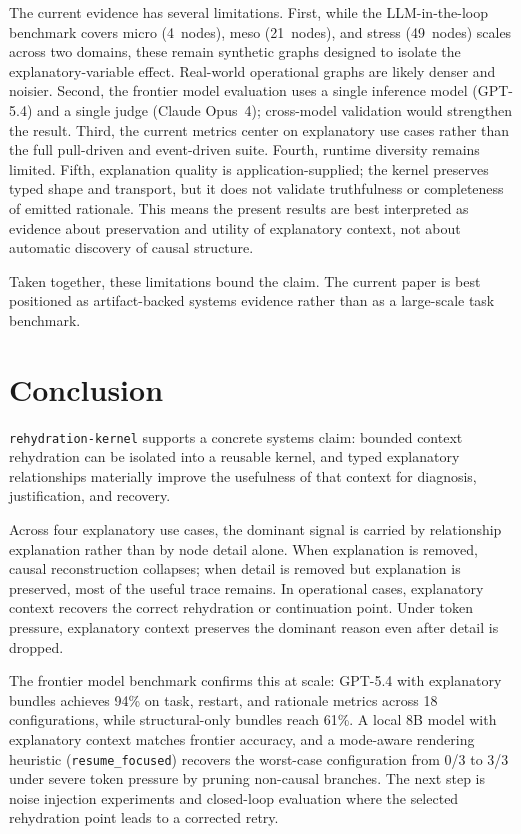 \documentclass[11pt]{article}
\begin{document}
The current evidence has several limitations. First, while the
LLM-in-the-loop benchmark covers micro (4~nodes), meso (21~nodes), and stress
(49~nodes) scales across two domains, these remain synthetic graphs designed to
isolate the explanatory-variable effect. Real-world operational graphs are
likely denser and noisier. Second, the frontier model evaluation uses a single
inference model (GPT-5.4) and a single judge (Claude Opus~4); cross-model
validation would strengthen the result. Third, the current metrics center on
explanatory use cases rather than the full pull-driven and event-driven suite.
Fourth, runtime diversity remains limited. Fifth, explanation quality is
application-supplied; the kernel preserves typed shape and transport, but it
does not validate truthfulness or completeness of emitted rationale. This means
the present results are best interpreted as evidence about preservation and
utility of explanatory context, not about automatic discovery of causal
structure.

Taken together, these limitations bound the claim. The current paper is best
positioned as artifact-backed systems evidence rather than as a large-scale
task benchmark.

\section{Conclusion}

\texttt{rehydration-kernel} supports a concrete systems claim: bounded context
rehydration can be isolated into a reusable kernel, and typed explanatory
relationships materially improve the usefulness of that context for diagnosis,
justification, and recovery.

Across four explanatory use cases, the dominant signal is carried by
relationship explanation rather than by node detail alone. When explanation is
removed, causal reconstruction collapses; when detail is removed but
explanation is preserved, most of the useful trace remains. In operational
cases, explanatory context recovers the correct rehydration or continuation
point. Under token pressure, explanatory context preserves the dominant reason
even after detail is dropped.

The frontier model benchmark confirms this at scale: GPT-5.4 with explanatory
bundles achieves 94\% on task, restart, and rationale metrics across 18
configurations, while structural-only bundles reach 61\%. A local 8B model
with explanatory context matches frontier accuracy, and a mode-aware rendering
heuristic (\texttt{resume\_focused}) recovers the worst-case configuration
from 0/3 to 3/3 under severe token pressure by pruning non-causal branches.
The next step is noise injection experiments and closed-loop evaluation where
the selected rehydration point leads to a corrected retry.
\end{document}
